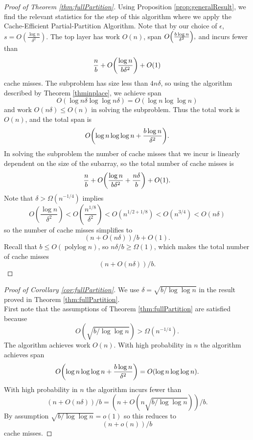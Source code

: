 \documentclass[sigconf]{acmart}
\DeclarePairedDelimiter{\paren}{(}{)}
\theoremstyle{remark}
\theoremstyle{remark}
\begin{document}
\begin{proof}[Proof of Theorem \ref{thm:fullPartition}]
	Using Proposition \ref{prop:generalResult}, we find the relevant statistics for the step of this algorithm where we apply the Cache-Efficient Partial-Partition Algorithm. 
	Note that by our choice of $\epsilon$, $s=O\left(\frac{\log n}{\delta^2}\right)$.
	The top layer has work $O(n)$, span $O\paren*{\frac{b\log n}{\delta^2}},$
	and incurs fewer than 
	$$\frac{n}{b}+O\paren*{\frac{\log n}{b\delta^2}}+O(1)$$ 
	cache misses.
	The subproblem has size less than $4n\delta$, so using the algorithm described by Theorem \ref{thminplace}, we achieve span
	$$O(\log n\delta \log\log n\delta) = O(\log n \log\log n)$$
	and work $O(n\delta) \le O(n)$ in solving the subproblem.
	Thus the total work is $O(n)$, and the total span is 
	$$O\paren*{\log n \log\log n +\frac{b\log n}{\delta^2}}.$$
	In solving the subproblem the number of cache misses that we incur is linearly dependent on the size of the subarray, so the total number of cache misses is 
	$$\frac{n}{b}+O\paren*{\frac{\log n}{b\delta^2} + \frac{n\delta}{b}}+O(1).$$ 
	Note that $\delta > \Omega(n^{-1/4})$ implies 
	$$O\left(  \frac{\log n}{\delta^2} \right) < O\left(\frac{n^{1/8}}{\delta^2}\right) < O\left(n^{1/2+1/8}\right) < O\left(n^{3/4}\right) < O(n\delta) $$
	so the number of cache misses simplifies to 
	$$(n+O(n\delta))/b + O(1).$$
	Recall that $b \le O(\operatorname{polylog}{n})$, so $n\delta / b \ge \Omega(1)$, which makes the total number of cache misses
	$$(n+O(n\delta))/b.$$

\end{proof}

\begin{proof}[Proof of Corollary \ref{cor:fullPartition}]
	We use $\delta = \sqrt{b/\log\log n}$ in the result proved in Theorem \ref{thm:fullPartition}. \\
	First note that the assumptions of Theorem \ref{thm:fullPartition} are satisfied because $$O(\sqrt{b/\log\log n}) > \Omega(n^{-1/4}).$$
	The algorithm achieves work $O(n)$. 
	With high probability in $n$ the algorithm achieves span 
	$$O\paren*{\log n \log\log n +\frac{b\log n}{\delta^2}} = O(\log n\log\log n).$$
	With high probability in $n$ the algorithm incurs fewer than 
	$$(n+O(n\delta))/b = (n+O(n\sqrt{b/\log\log n}))/b.$$ 
	By assumption $\sqrt{b/\log\log n} = o(1)$ so this reduces to 
	$$(n+o(n))/b$$
	cache misses.
\end{proof}
\end{document}
